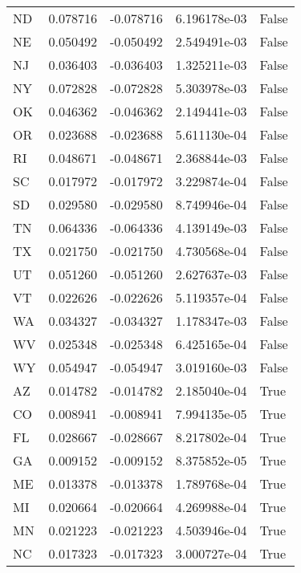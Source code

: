 \begin{table}
\begin{tabular}{lrrrl}
      ND &   0.078716 & -0.078716 &   6.196178e-03 &         False \\
      NE &   0.050492 & -0.050492 &   2.549491e-03 &         False \\
      NJ &   0.036403 & -0.036403 &   1.325211e-03 &         False \\
      NY &   0.072828 & -0.072828 &   5.303978e-03 &         False \\
      OK &   0.046362 & -0.046362 &   2.149441e-03 &         False \\
      OR &   0.023688 & -0.023688 &   5.611130e-04 &         False \\
      RI &   0.048671 & -0.048671 &   2.368844e-03 &         False \\
      SC &   0.017972 & -0.017972 &   3.229874e-04 &         False \\
      SD &   0.029580 & -0.029580 &   8.749946e-04 &         False \\
      TN &   0.064336 & -0.064336 &   4.139149e-03 &         False \\
      TX &   0.021750 & -0.021750 &   4.730568e-04 &         False \\
      UT &   0.051260 & -0.051260 &   2.627637e-03 &         False \\
      VT &   0.022626 & -0.022626 &   5.119357e-04 &         False \\
      WA &   0.034327 & -0.034327 &   1.178347e-03 &         False \\
      WV &   0.025348 & -0.025348 &   6.425165e-04 &         False \\
      WY &   0.054947 & -0.054947 &   3.019160e-03 &         False \\
      AZ &   0.014782 & -0.014782 &   2.185040e-04 &          True \\
      CO &   0.008941 & -0.008941 &   7.994135e-05 &          True \\
      FL &   0.028667 & -0.028667 &   8.217802e-04 &          True \\
      GA &   0.009152 & -0.009152 &   8.375852e-05 &          True \\
      ME &   0.013378 & -0.013378 &   1.789768e-04 &          True \\
      MI &   0.020664 & -0.020664 &   4.269988e-04 &          True \\
      MN &   0.021223 & -0.021223 &   4.503946e-04 &          True \\
      NC &   0.017323 & -0.017323 &   3.000727e-04 &          True \\

\end{tabular}
\end{table}
